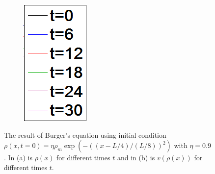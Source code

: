 \begin{figure}[h!]
\begin{subfigure}{.09\textwidth}
	\includegraphics[width=\textwidth]{img/exc3_legend}
\end{subfigure}
\caption{The result of Burger's equation using initial condition $\rho(x, t=0) = \eta \rho_m \exp(-\left((x-L/4)/(L/8)\right)^2)$ with $\eta=0.9$. In (a) is $\rho(x)$ for different times $t$ and in (b) is $v(\rho(x))$ for different times $t$.}
\label{fig:exc3_congestion_eta09}
\end{figure}
\FloatBarrier